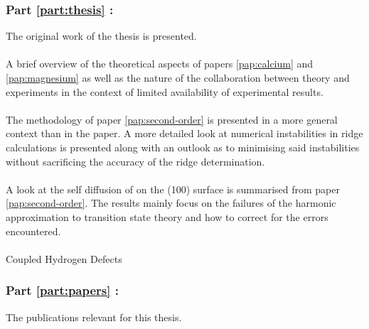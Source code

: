 \subsubsection{Part \ref{part:thesis} : }
The original work of the thesis is presented.

\paragraph{}
A brief overview of the theoretical aspects of papers \ref{pap:calcium} and \ref{pap:magnesium} as well as the nature of the collaboration between theory and experiments in the context of limited availability of experimental results.

\paragraph{}
The methodology of paper \ref{pap:second-order} is presented in a more general context than in the paper.
A more detailed look at numerical instabilities in ridge calculations is presented along with an outlook as to minimising said instabilities without sacrificing the accuracy of the ridge determination.

\paragraph{}
A look at the self diffusion of  on the (100) surface is summarised from paper \ref{pap:second-order}.
The results mainly focus on the failures of the harmonic approximation to transition state theory and how to correct for the errors encountered.

\paragraph{}
Coupled Hydrogen Defects \expand

\subsubsection{Part \ref{part:papers} : }
The publications relevant for this thesis.
